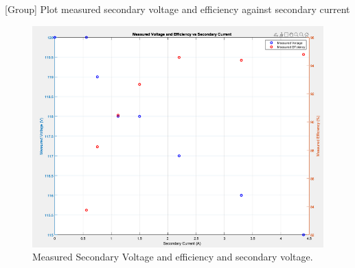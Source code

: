 \documentclass[11pt]{article}
\begin{document}
{[}Group] Plot measured secondary voltage and efficiency against secondary current
\begin{FIGURE}
\begin{figure}[H]
\centering
\includegraphics[width=.9\linewidth]{Screenshot 2024-09-29 at 12-34-22 Single and 3-Phase Transformers Lab 3 Report Miley Fleming 584058.docx.png}
\caption{Measured Secondary Voltage and efficiency and secondary voltage.}
\end{figure}
\end{FIGURE}
\end{document}
